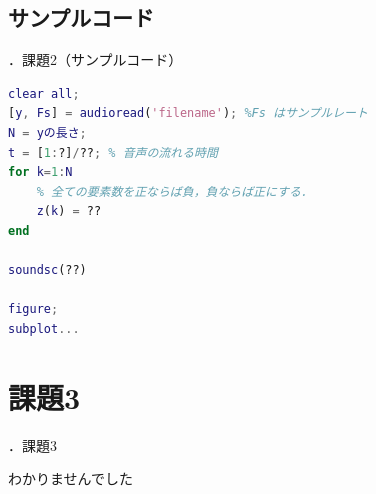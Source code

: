 \documentclass[aspectratio=43]{beamer}
\newcommand{\showsec}{\thesection ．}
\begin{document}
\subsection{サンプルコード}
\begin{frame}[t,containsverbatim]{\showsec 課題2（サンプルコード）}
    \begin{lstlisting}[language={Matlab}]
clear all;
[y, Fs] = audioread('filename'); %Fs はサンプルレート
N = yの長さ;
t = [1:?]/??; % 音声の流れる時間
for k=1:N
    % 全ての要素数を正ならば負，負ならば正にする．
    z(k) = ??
end

soundsc(??)

figure;
subplot...
    \end{lstlisting}
\end{frame}
\section{課題3}
\begin{frame}{\showsec 課題3}
    \begin{center}
        {\Huge わかりませんでした}
    \end{center}
\end{frame}
\end{document}
